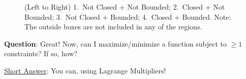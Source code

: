 \documentclass[12pt]{article}
\renewcommand{\Q}{\vspace{6mm}\noindent\textbf{Question}: }
\newcommand{\Short}{\ul{Short Answer}: }
\begin{document}
	\begin{figure}[ht!]
		\begin{minipage}[t]{\linewidth}
			\centering
			\quad
			\quad
			\quad
		\end{minipage}
		\caption{(Left to Right) 1.~Not Closed + Not Bounded; 2.~Closed + Not Bounded; 3.~Not Closed + Bounded; 4.~Closed + Bounded. Note: The outside boxes are not included in any of the regions.}
	\end{figure}
	
	\newpage
	
	\Q Great! Now, can I maximize/minimize a function subject to $\geq 1$ constraints? If so, how?
	
	\Short You can, using Lagrange Multipliers!
	
\end{document}
